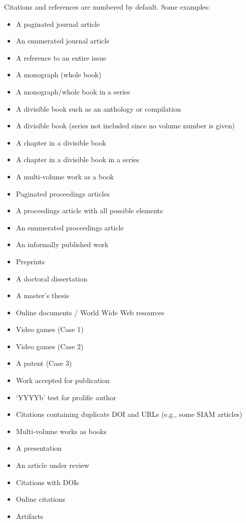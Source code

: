 Citations and references are numbered by default. Some examples:
\begin{itemize}
\item A paginated journal article \cite{Abril07}
\item An enumerated journal article \cite{Cohen07}
\item A reference to an entire issue \cite{JCohen96}
\item A monograph (whole book) \cite{Kosiur01}
\item A monograph/whole book in a series \cite{Harel79}
\item A divisible book such as an anthology or compilation \cite{Editor00}
\item A divisible book (series not included since no volume number is given) \cite{Editor00a}
\item A chapter in a divisible book \cite{Spector90}
\item A chapter in a divisible book in a series \cite{Douglass98}
\item A multi-volume work as a book \cite{Knuth97}
\item Paginated proceedings articles \cite{Andler79, Hagerup1993}
\item A proceedings article with all possible elements \cite{Smith10}
\item An enumerated proceedings article \cite{VanGundy07}
\item An informally published work \cite{Harel78}
\item Preprints \cite{Bornmann2019, AnzarootPBM14}
\item A doctoral dissertation \cite{Clarkson85}
\item A master's thesis \cite{anisi03}
\item Online documents / World Wide Web resources \cite{Thornburg01, Ablamowicz07, Poker06}
\item Video games (Case 1) \cite{Obama08}
\item Video games (Case 2) \cite{Novak03, Lee05}
\item A patent (Case 3) \cite{JoeScientist001}
\item Work accepted for publication \cite{rous08}
\item `YYYYb' test for prolific author \cite{SaeediMEJ10, SaeediJETC10}
\item Citations containing duplicate DOI and URLs (e.g., some SIAM articles) \cite{Kirschmer:2010:AEI:1958016.1958018}
\item Multi-volume works as books \cite{MR781536, MR781537}
\item A presentation \cite{Reiser2014}
\item An article under review \cite{Baggett2025}
\item Citations with DOIs \cite{2004:ITE:1009386.1010128, Kirschmer:2010:AEI:1958016.1958018}
\item Online citations \cite{TUGInstmem, Thornburg01, CTANacmart}
\item Artifacts \cite{R, UMassCitations}
\end{itemize}


